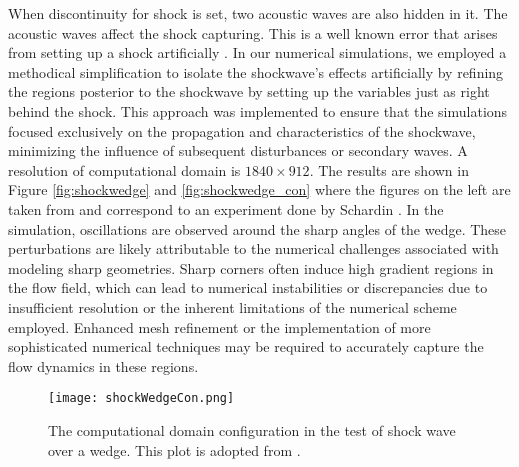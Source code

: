 When discontinuity for shock is set, two acoustic waves are also hidden in it. The acoustic waves affect the shock capturing. This is a well known error that arises from setting up a shock artificially \cite{LeVeque1998,Glaz1985,Hillier1995}. In our numerical simulations, we employed a methodical simplification to isolate the shockwave's effects artificially by refining the regions posterior to the shockwave by setting up the variables just as right behind the shock. This approach was implemented to ensure that the simulations focused exclusively on the propagation and characteristics of the shockwave, minimizing the influence of subsequent disturbances or secondary waves. A resolution of computational domain is $1840\times912$. The results are shown in Figure \ref{fig:shockwedge} and \ref{fig:shockwedge_con} where the figures on the left are taken from \cite{sivier1992vorticity} and correspond to an experiment done by Schardin \cite{schardin1966stossrohre}. In the simulation, oscillations are observed around the sharp angles of the wedge. These perturbations are likely attributable to the numerical challenges associated with modeling sharp geometries. Sharp corners often induce high gradient regions in the flow field, which can lead to numerical instabilities or discrepancies due to insufficient resolution or the inherent limitations of the numerical scheme employed. Enhanced mesh refinement or the implementation of more sophisticated numerical techniques may be required to accurately capture the flow dynamics in these regions.
\begin{figure}
    \centering
    \texttt{[image: shockWedgeCon.png]}
    \caption[Configuration of Shock Wave and Wedge]{The computational domain configuration in the test of shock wave over a wedge. This plot is adopted from \cite{sivier1992vorticity}.}
    \label{fig:shockwedgecon}
\end{figure}

